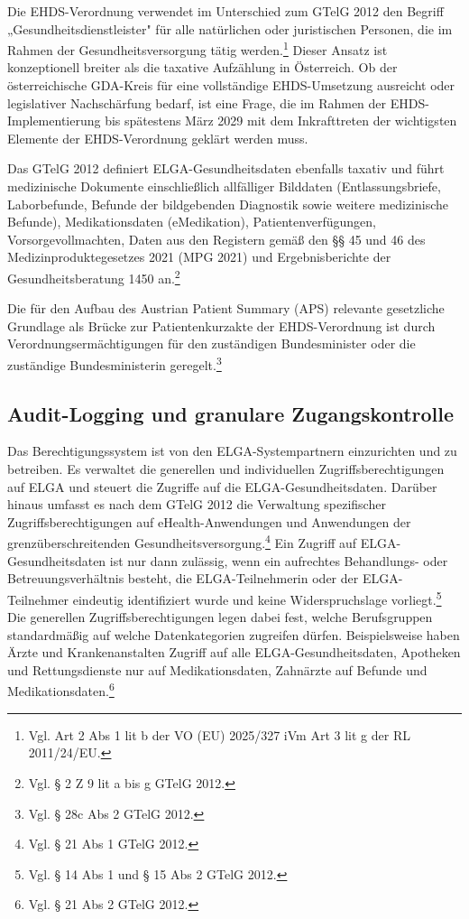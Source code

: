 Die EHDS-Verordnung verwendet im Unterschied zum GTelG 2012 den Begriff „Gesundheitsdienstleister" für alle natürlichen oder juristischen Personen, die im Rahmen der Gesundheitsversorgung tätig werden.\footnote{Vgl. Art 2 Abs 1 lit b der VO (EU) 2025/327 iVm Art 3 lit g der RL 2011/24/EU.} Dieser Ansatz ist konzeptionell breiter als die taxative Aufzählung in Österreich. Ob der österreichische GDA-Kreis für eine vollständige EHDS-Umsetzung ausreicht oder legislativer Nachschärfung bedarf, ist eine Frage, die im Rahmen der EHDS-Implementierung bis spätestens März 2029 mit dem Inkrafttreten der wichtigsten Elemente der EHDS-Verordnung geklärt werden muss.

Das GTelG 2012 definiert ELGA-Gesundheitsdaten ebenfalls taxativ und führt medizinische Dokumente einschließlich allfälliger Bilddaten (Entlassungsbriefe, Laborbefunde, Befunde der bildgebenden Diagnostik sowie weitere medizinische Befunde), Medikationsdaten (eMedikation), Patientenverfügungen, Vorsorgevollmachten, Daten aus den Registern gemäß den §§ 45 und 46 des Medizinproduktegesetzes 2021 (MPG 2021) und
Ergebnisberichte der Gesundheitsberatung 1450 an.\footnote{Vgl. § 2 Z 9 lit a bis g GTelG 2012.}

Die für den Aufbau des Austrian Patient Summary (APS) relevante gesetzliche Grundlage als Brücke zur Patientenkurzakte der EHDS-Verordnung ist durch Verordnungsermächtigungen für den zuständigen Bundesminister oder die zuständige Bundesministerin geregelt.\footnote{Vgl. § 28c Abs 2 GTelG 2012.}

        \subsection{Audit-Logging und granulare Zugangskontrolle}
Das Berechtigungssystem ist von den ELGA-Systempartnern einzurichten und zu betreiben. Es verwaltet die generellen und individuellen Zugriffsberechtigungen auf ELGA und steuert die Zugriffe auf die ELGA-Gesundheitsdaten. Darüber hinaus umfasst es nach dem GTelG 2012 die Verwaltung spezifischer Zugriffsberechtigungen auf eHealth-Anwendungen und Anwendungen der grenzüberschreitenden Gesundheitsversorgung.\footnote{Vgl. § 21 Abs 1 GTelG 2012.}  Ein Zugriff auf ELGA-Gesundheitsdaten ist nur dann zulässig, wenn ein aufrechtes Behandlungs- oder Betreuungsverhältnis besteht, die ELGA-Teilnehmerin oder der ELGA-Teilnehmer eindeutig identifiziert wurde und keine Widerspruchslage vorliegt.\footnote{Vgl. § 14 Abs 1 und § 15 Abs 2 GTelG 2012.} Die generellen Zugriffsberechtigungen legen dabei fest, welche Berufsgruppen standardmäßig auf welche Datenkategorien zugreifen dürfen. Beispielsweise haben Ärzte und Krankenanstalten  Zugriff auf alle ELGA-Gesundheitsdaten, Apotheken und Rettungsdienste nur auf Medikationsdaten, Zahnärzte auf Befunde und Medikationsdaten.\footnote{Vgl. § 21 Abs 2 GTelG 2012.}

